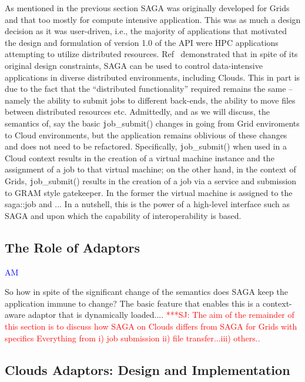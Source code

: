\documentclass[conference,final]{IEEEtran}
\newcommand{\jhanote}[1]{ {\textcolor{red} { ***SJ: #1 }}}
\newcommand{\jhanote}[1]{}
\begin{document}
As mentioned in the previous section SAGA was originally developed for
Grids and that too mostly for compute intensive application. This was
as much a design decision as it was user-driven, i.e., the majority of
applications that motivated the design and formulation of version 1.0
of the API were HPC applications attempting to utilize distributed
resources.  Ref~\cite{saga_ccgrid09} demonstrated that in spite of its
original design constraints, SAGA can be used to control
data-intensive applications in diverse distributed environments,
including Clouds.  This in part is due to the fact that the
``distributed functionality'' required remains the same -- namely the
ability to submit jobs to different back-ends, the ability to move
files between distributed resources etc. Admittedly, and as we will
discuss, the semantics of, say the basic {\texttt job\_submit()}
changes in going from Grid enviroments to Cloud environments, but the
application remains oblivious of these changes and does not need to be
refactored. Specifically, {\texttt job\_submit()} when used in a Cloud
context results in the creation of a virtual machine instance and the
assignment of a job to that virtual machine; on the other hand, in the
context of Grids, {\texttt job\_submit()} results in the creation of a
job via a service and submission to GRAM style gatekeeper. In the
former the virtual machine is assigned to the saga::job and ...  In a
nutshell, this is the power of a high-level interface such as SAGA and
upon which the capability of interoperability is based.

\subsection{The Role of Adaptors} {\textcolor{blue} {AM}}

So how in spite of the significant change of the semantics does SAGA
keep the application immune to change? The basic feature that enables
this is a context-aware adaptor that is dynamically loaded....
\jhanote{The aim of the remainder of this section is to discuss how
  SAGA on Clouds differs from SAGA for Grids with specifics Everything
  from i) job submission ii) file transfer...iii) others..}


\subsection{Clouds Adaptors: Design and Implementation}
\end{document}
